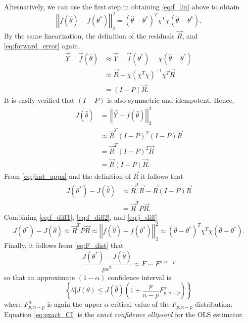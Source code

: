 \documentclass[10pt]{article}
\newcommand{\vecnorm}[1]{\left|\left|#1\right|\right|}
\begin{document}
Alternatively, we can use the first step in obtaining \eqref{eq:f_lin} above to obtain
\begin{equation}\label{eq:f_diff2}
\vecnorm{f(\hat{\theta}) - f(\theta^{*})}_{2}^{2} = (\hat{\theta} - \theta^{*})^{T}\chi^{T}\chi(\hat{\theta} - \theta^{*}).
\end{equation}
By the same linearization, the definition of the residuals $\vec{R}$, and \eqref{eq:forward_error} again,
\begin{align*}
\vec{Y} - \vec{f}(\hat{\theta}) & \approx \vec{Y} - \vec{f}(\theta^{*}) - \chi(\hat{\theta} - \theta^{*})\\
	& \approx \vec{R} - \chi(\chi^{T}\chi)^{-1}\chi^{T}\vec{R}\\
	& = (I - P)\vec{R}.
\end{align*}
It is easily verified that $(I-P)$ is also symmetric and idempotent.  Hence,
\begin{align}
J(\hat{\theta}) & = \vecnorm{\vec{Y} - f(\hat{\theta})}_{2}^{2}\nonumber\\
	& \approx \vec{R}^{T}(I-P)^{T}(I-P)\vec{R}\nonumber\\
	& = \vec{R}^{T}(I-P)^{2}\vec{R}\nonumber\\
	& = \vec{R}(I-P)\vec{R}.\label{eq:jhat_appx}
\end{align}
From \eqref{eq:jhat_appx} and the definition of $\vec{R}$ it follows that
\begin{align}
J(\theta^{*}) - J(\hat{\theta}) & \approx \vec{R}^{T}\vec{R} - \vec{R}(I-P)\vec{R}\nonumber\\
	& = \vec{R}^{T} P \vec{R}.\label{eq:j_diff}
\end{align}
Combining \eqref{eq:f_diff1}, \eqref{eq:f_diff2}, and \eqref{eq:j_diff}
\begin{equation*}
J(\theta^{*}) - J(\hat{\theta}) \approx \vec{R}^{T} P \vec{R} \approx \vecnorm{f(\hat{\theta}) - f(\theta^{*})}_{2}^{2} \approx (\hat{\theta} - \theta^{*})^{T}\chi^{T}\chi(\hat{\theta} - \theta^{*}).
\end{equation*}
Finally, it follows from \eqref{eq:F_dist} that
\begin{equation*}
\frac{J(\theta^{*}) - J(\hat{\theta})}{ps^{2}} \approx F \sim F^{p,n-p}
\end{equation*}
so that an approximate $(1-\alpha)$ confidence interval is
\begin{equation}\label{eq:exact_CI}
\left\{\theta \Big| J(\theta) \leq J(\hat{\theta})\left(1 + \frac{p}{n-p}F_{p,n-p}^{\alpha}\right)\right\}
\end{equation}
where $F_{p,n-p}^{\alpha}$ is again the upper-$\alpha$ critical value of the $F_{p,n-p}$ distribution.  Equation \eqref{eq:exact_CI} is the \emph{exact confidence ellipsoid} \cite[Sec. 3.3.1]{SeberWild} for the OLS estimator.
\end{document}
